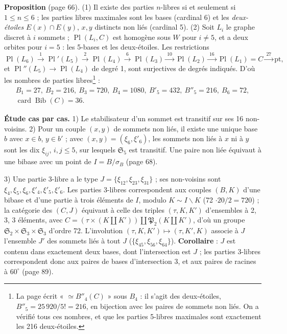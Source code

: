 \documentclass[11pt,a4paper]{article}
\begin{document}
\textbf{Proposition} (page 66). (1) Il existe des parties $n$-libres si et
seulement si $1 \leq n \leq 6$ ; les parties libres maximales sont les bases
(cardinal 6) et les \emph{deux-étoiles} $E(x) \cap E(y)$, $x, y$ distincts non
liés (cardinal 5). (2) Soit $L_i$ le graphe discret à $i$ sommets ;
$\operatorname{Pl}(L_i, C)$ est homogène sous $W$ pour $i \neq 5$, et a deux
orbites pour $i = 5$ : les 5-bases et les deux-étoiles. Les restrictions
\[
\operatorname{Pl}(L_6) \xrightarrow{\ 1\ } \operatorname{Pl}'(L_5)
\xrightarrow{\ 2\ } \operatorname{Pl}(L_4) \xrightarrow{\ 6\ }
\operatorname{Pl}(L_3) \xrightarrow{\ 10\ } \operatorname{Pl}(L_2)
\xrightarrow{\ 16\ } \operatorname{Pl}(L_1) = C \xrightarrow{\ 27\ }
\mathrm{pt},
\]
et $\operatorname{Pl}''(L_5) \to \operatorname{Pl}(L_4)$ de degré 1, sont
surjectives de degrés indiqués. D'où les nombres de parties libres\footnote{La page écrit « $\simeq B''_4(C)$ » sous $B_4$ : il s'agit des
deux-étoiles, $B''_5 = 25\,920/5! = 216$, en bijection avec les paires de
sommets non liés. On a vérifié tous ces nombres, et que les parties 5-libres
maximales sont exactement les 216 deux-étoiles.} :
\[
\begin{gathered}
B_1 = 27, \ B_2 = 216, \ B_3 = 720, \ B_4 = 1080, \ B'_5 = 432, \ B''_5 = 216,
\ B_6 = 72, \\ \operatorname{card} \operatorname{Bib}(C) = 36 .
\end{gathered}
\]

\textbf{Étude cas par cas.} 1) Le stabilisateur d'un sommet est transitif sur
ses 16 non-voisins. 2) Pour un couple $(x, y)$ de sommets non liés, il existe
une unique base $b$ avec $x \in b$, $y \in b'$ ; avec $(x, y) = (\xi_6, \xi'_6)$,
les sommets non liés à $x$ ni à $y$ sont les dix $\xi_{ij}$, $i, j \leq 5$, sur
lesquels $\mathfrak{S}_5$ est transitif. Une paire non liée équivaut à une
bibase avec un point de $I = B/\sigma_B$ (page 68).

3) Une partie 3-libre a le type $J = \lbrace \xi_{12}, \xi_{23},
\xi_{31}\rbrace$ ; ses non-voisins sont $\xi_4, \xi_5, \xi_6, \xi'_4, \xi'_5,
\xi'_6$. Les parties 3-libres correspondent aux couples $(B, K)$ d'une bibase
et d'une partie à trois éléments de $I$, modulo $K \sim I \smallsetminus K$ (72
$\cdot 20/2 = 720$) ; la catégorie des $(C, J)$ équivaut à celle des triples
$(\tau, K, K')$ d'ensembles à 2, 3, 3 éléments, avec $C = (\tau \times (K
\amalg K')) \amalg \mathfrak{P}_2(K \amalg K')$, d'où un groupe
$\mathfrak{S}_2 \times \mathfrak{S}_3 \times \mathfrak{S}_3$ d'ordre 72.
L'involution $(\tau, K, K') \mapsto (\tau, K', K)$ associe à $J$ l'ensemble $J'$
des sommets liés à tout $J$ ($\lbrace \xi_{45}, \xi_{56}, \xi_{64}\rbrace$).
\textbf{Corollaire} : $J$ est contenu dans exactement deux bases, dont
l'intersection est $J$ ; les parties 3-libres correspondent donc aux paires de
bases d'intersection 3, et aux paires de racines à $60^\circ$ (page 89).
\end{document}
